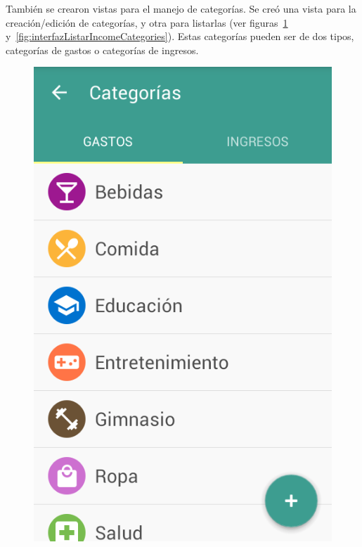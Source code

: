 También se crearon vistas para el manejo de categorías. Se creó una vista para la creación/edición de categorías, y otra para listarlas (ver figuras~\ref{fig:interfazListarExpenseCategories} y~\ref{fig:interfazListarIncomeCategories}). Estas categorías pueden ser de dos tipos, categorías de gastos o categorías de ingresos.

\begin{figure}[ht]
\centering
\begin{minipage}{.5\textwidth}
  \centering
  \includegraphics[scale=0.4,type=png,ext=.png,read=.png]{imagenes/expense_categories}
  \captionsetup{justification=centering}
  \label{fig:interfazListarExpenseCategories}
\end{minipage}%

\end{figure}
